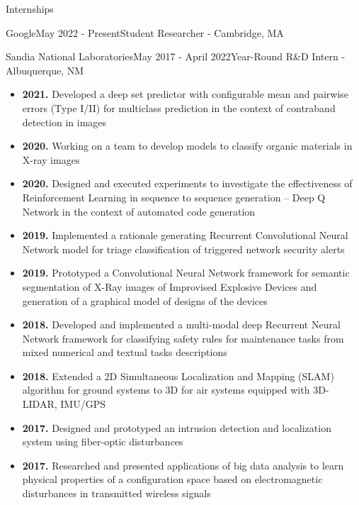 \documentclass{resume} %
\begin{document}
\begin{rSection}{Internships}
\begin{rSubsection}{Google}{May 2022 - Present}{Student Researcher - Cambridge, MA}

\end{rSubsection}

\begin{rSubsection}{Sandia National Laboratories}{May 2017 - April 2022}{Year-Round R\&D Intern - Albuquerque, NM}

\begin{itemize}[label={}]
    \setlength\itemsep{0em}
    \item \textbf{2021.} Developed a deep set predictor with configurable mean and pairwise errors (Type I/II) for multiclass prediction in the context of contraband detection in images
    \item \textbf{2020.} Working on a team to develop models to classify organic materials in X-ray images
    \item \textbf{2020.} Designed and executed experiments to investigate the effectiveness of Reinforcement Learning in sequence to sequence generation -- Deep Q Network in the context of automated code generation
    \item \textbf{2019.} Implemented a rationale generating Recurrent Convolutional Neural Network model for triage classification of triggered network security alerts
    \item \textbf{2019.} Prototyped a Convolutional Neural Network framework for semantic segmentation of X-Ray images of Improvised Explosive Devices and generation of a graphical model of designs of the devices
    \item \textbf{2018.} Developed and implemented a multi-modal deep Recurrent Neural Network framework for classifying safety rules for maintenance tasks from mixed numerical and textual tasks descriptions
    \item \textbf{2018.} Extended a 2D Simultaneous Localization and Mapping (SLAM) algorithm for ground systems to 3D for air systems equipped with 3D-LIDAR, IMU/GPS
    \item \textbf{2017.} Designed and prototyped an intrusion detection and localization system using fiber-optic disturbances 
    \item \textbf{2017.} Researched and presented applications of big data analysis to learn physical properties of a configuration space based on electromagnetic disturbances in transmitted wireless signals
\end{itemize}

\end{rSubsection}
\end{rSection}
\end{document}
